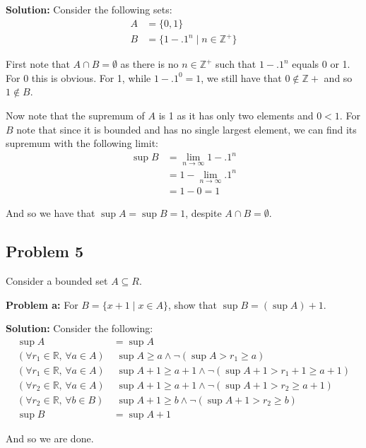 \documentclass{article}
\newcommand{\R}{\mathbb R}
\newcommand{\Z}{\mathbb Z}
\begin{document}
\noindent\textbf{Solution:} Consider the following sets:
\begin{align*}
  A&=\{0,1\}\\
  B&=\{1-.1^n\mid n\in\Z^+\}
\end{align*}

First note that $A\cap B=\emptyset$ as there is no $n\in\Z^+$ such that $1-.1^n$ equals 0 or 1. For 0 this is obvious. For 1, while $1-.1^0=1$, we still have that $0\not\in\Z+$ and so $1\not\in B$.

Now note that the supremum of $A$ is 1 as it has only two elements and $0<1$. For $B$ note that since it is bounded and has no single largest element, we can find its supremum with the following limit:
\begin{align*}
  \sup B&=\lim_{n\to\infty}1-.1^n\\
  &=1-\lim_{n\to\infty}.1^n\\
  &=1-0=1
\end{align*}

And so we have that $\sup A = \sup B = 1$, despite $A\cap B=\emptyset$.

\subsection*{Problem 5}
Consider a bounded set $A\subseteq R$.
\bigskip

\noindent\textbf{Problem a:} For $B=\{x+1\mid x\in A\}$, show that $\sup B=(\sup A)+1$.
\bigskip

\noindent\textbf{Solution:} Consider the following:
\begin{align*}
  \sup A &= \sup A\\
  (\forall r_1\in\R,\,\forall a\in A)&\,\,\sup A\ge a\wedge\neg(\sup A>r_1\ge a)\tag{def. of supremum}\\
  (\forall r_1\in\R,\,\forall a\in A)&\,\,\sup A+1\ge a+1\wedge\neg(\sup A+1>r_1+1\ge a+1)\tag{$x+1$ is an increasing function}\\
  (\forall r_2\in\R,\,\forall a\in A)&\,\,\sup A+1\ge a+1\wedge\neg(\sup A+1>r_2\ge a+1)\tag{$(\forall r_1\in\R,\,\exists r_2\in\R)\,\,r_2=r_1+1$}\\
  (\forall r_2\in\R,\,\forall b\in B)&\,\,\sup A+1\ge b\wedge\neg(\sup A+1>r_2\ge b)\tag{$a\in A\iff a+1\in B$ (i.e. def. of $B$)}\\
  \sup B &= \sup A + 1\tag{def. of supremum}
\end{align*}

And so we are done.
\bigskip
\end{document}
